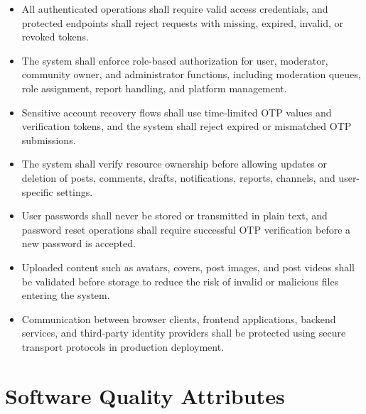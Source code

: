 \documentclass{scrreprt}
\begin{document}
\begin{itemize}[leftmargin=2cm]
    \item[\textbf{SR-1:}] All authenticated operations shall require valid access credentials, and protected endpoints shall reject requests with missing, expired, invalid, or revoked tokens.
    \item[\textbf{SR-2:}] The system shall enforce role-based authorization for user, moderator, community owner, and administrator functions, including moderation queues, role assignment, report handling, and platform management.
    \item[\textbf{SR-3:}] Sensitive account recovery flows shall use time-limited OTP values and verification tokens, and the system shall reject expired or mismatched OTP submissions.
    \item[\textbf{SR-4:}] The system shall verify resource ownership before allowing updates or deletion of posts, comments, drafts, notifications, reports, channels, and user-specific settings.
    \item[\textbf{SR-5:}] User passwords shall never be stored or transmitted in plain text, and password reset operations shall require successful OTP verification before a new password is accepted.
    \item[\textbf{SR-6:}] Uploaded content such as avatars, covers, post images, and post videos shall be validated before storage to reduce the risk of invalid or malicious files entering the system.
    \item[\textbf{SR-7:}] Communication between browser clients, frontend applications, backend services, and third-party identity providers shall be protected using secure transport protocols in production deployment.
\end{itemize}

\section{Software Quality Attributes}
\end{document}
